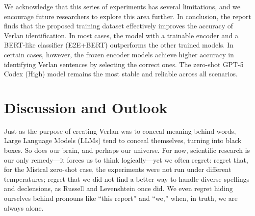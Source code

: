\documentclass[12pt]{article}
\begin{document}
We acknowledge that this series of experiments has several limitations, and we encourage future researchers to explore this area further. 
In conclusion, the report finds that the proposed training dataset effectively improves the accuracy of Verlan identification. 
In most cases, the model with a trainable encoder and a BERT-like classifier (E2E+BERT) outperforms the other trained models. 
In certain cases, however, the frozen encoder models achieve higher accuracy in identifying Verlan sentences by selecting the correct ones. 
The zero-shot GPT-5 Codex (High) model remains the most stable and reliable across all scenarios.

\section{Discussion and Outlook}

Just as the purpose of creating Verlan was to conceal meaning behind words, Large Language Models (LLMs) tend to conceal themselves, turning into black boxes. 
So does our brain, and perhaps our universe. 
For now, scientific research is our only remedy\;---\;it forces us to think logically\;---\;yet we often regret: 
regret that, for the Mistral zero-shot case, the experiments were not run under different temperatures; 
regret that we did not find a better way to handle diverse spellings and declensions, as Russell and Levenshtein once did. 
We even regret hiding ourselves behind pronouns like ``this report'' and ``we,'' when, in truth, we are always alone. 
\end{document}
